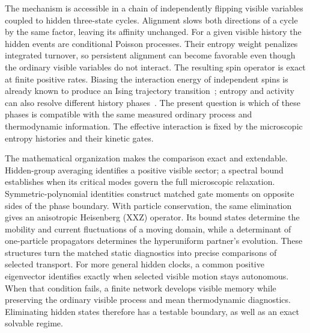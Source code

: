 \documentclass[aps,pre,reprint,amsmath,amssymb,longbibliography,floatfix]{revtex4-2}
\begin{document}
The mechanism is accessible in a chain of independently flipping visible
variables coupled to hidden three-state cycles. Alignment slows both
directions of a cycle by the same factor, leaving its affinity unchanged.
For a given visible history the hidden events are conditional Poisson
processes. Their entropy weight penalizes integrated turnover, so
persistent alignment can become favorable even though the ordinary
visible variables do not interact. The resulting spin operator is exact
at finite positive rates. Biasing the interaction energy of independent
spins is already known to produce an Ising trajectory
transition~\cite{JackSollich2010,VasiloiuOakesCarolloGarrahan2020}; entropy
and activity can also resolve different history
phases~\cite{GingrichVaikuntanathanGeissler2014}. The present question is
which of these phases is compatible with the same measured ordinary
process and thermodynamic information. The effective interaction is
fixed by the microscopic entropy histories and their kinetic gates.

The mathematical organization makes the comparison exact and
extendable. Hidden-group averaging identifies a positive visible sector;
a spectral bound establishes when its critical modes govern the full
microscopic relaxation. Symmetric-polynomial identities construct matched
gate moments on opposite sides of the phase boundary. With particle
conservation, the same elimination gives an anisotropic Heisenberg (XXZ) operator. Its bound
states determine the mobility and current fluctuations of a moving
domain, while a determinant of one-particle propagators determines the
hyperuniform partner's evolution. These structures turn the matched
static diagnostics into precise comparisons of selected transport.
For more general hidden clocks, a common positive eigenvector identifies
exactly when selected visible motion stays autonomous. When that
condition fails, a finite network develops visible memory while
preserving the ordinary visible process and mean thermodynamic diagnostics. Eliminating hidden states therefore
has a testable boundary, as well as an exact solvable regime.
\end{document}
